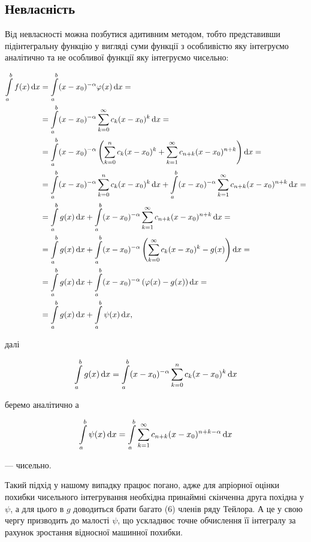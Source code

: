 \subsection{Невласність}

Від невласності можна позбутися адитивним методом, тобто представивши підінтегральну функцію у вигляді суми функції з особливістю яку інтегруємо аналітично та не особливої функції яку інтегруємо чисельно:

\begin{align*}
	\Int_{a}^{b} f(x) \diff x &= \Int_{a}^{b} (x - x_0)^{-\alpha} \varphi(x) \diff x = \\
	&= \Int_{a}^{b} (x - x_0)^{-\alpha} \Sum_{k = 0}^\infty c_k (x - x_0)^k \diff x = \\
	&= \Int_{a}^{b} (x - x_0)^{-\alpha} \left( \Sum_{k = 0}^n c_k (x - x_0)^k + \Sum_{k = 1}^\infty c_{n + k} (x - x_0)^{n + k} \right) \diff x = \\
	&= \Int_{a}^{b} (x - x_0)^{-\alpha} \Sum_{k = 0}^n c_k (x - x_0)^k \diff x + \Int_{a}^{b} (x - x_0)^{-\alpha} \Sum_{k = 1}^\infty c_{n + k} (x - x_0)^{n + k} \diff x = \\
	&= \Int_{a}^{b} g(x) \diff x + \Int_{a}^{b} (x - x_0)^{-\alpha} \Sum_{k = 1}^\infty c_{n + k} (x - x_0)^{n + k} \diff x = \\
	&= \Int_{a}^{b} g(x) \diff x + \Int_{a}^{b} (x - x_0)^{-\alpha} \left( \Sum_{k = 0}^\infty c_{k} (x - x_0)^{k} - g(x) \right) \diff x = \\
	&= \Int_{a}^{b} g(x) \diff x + \Int_{a}^{b} (x - x_0)^{-\alpha} \left( \phi(x) - g(x) \right) \diff x = \\
	&= \Int_{a}^{b} g(x) \diff x + \Int_{a}^{b} \psi(x) \diff x,
\end{align*}

далі 

\begin{equation}
	\displaystyle\int\limits_{a}^{b} g(x) \mathop{}\!\mathrm{d} x = \displaystyle\int\limits_{a}^{b} (x - x_0)^{-\alpha} \displaystyle\sum\limits_{k = 0}^n c_k (x - x_0)^k \mathop{}\!\mathrm{d} x
\end{equation}

беремо аналітично а

\begin{equation}
	\displaystyle\int\limits_{a}^{b} \psi(x) \mathop{}\!\mathrm{d} x = \displaystyle\int\limits_{a}^{b} \displaystyle\sum\limits_{k = 1}^{\infty} c_{n + k} (x - x_0)^{n + k - \alpha} \mathop{}\!\mathrm{d} x
\end{equation}

--- чисельно. \medskip

Такий підхід у нашому випадку працює погано, адже для апріорної оцінки похибки чисельного інтегрування необхідна принаймні скінченна друга похідна у $\psi$, а для цього в $g$ доводиться брати багато (6) членів ряду Тейлора. А це у свою чергу призводить до малості $\psi$, що ускладнює точне обчислення її інтегралу за рахунок зростання відносної машинної похибки. \medskip

